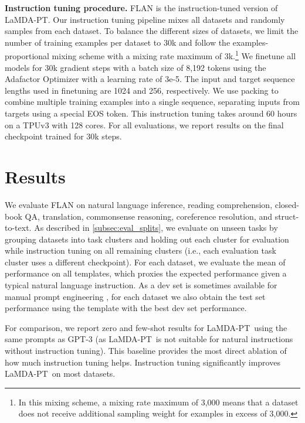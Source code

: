 \documentclass{article} \usepackage{iclr2022_conference,times}
\newcommand{\flan}{FLAN}
\newcommand{\baselm}{LaMDA-PT}
\begin{document}
\textbf{Instruction tuning procedure.}
\flan{} is the instruction-tuned version of \baselm. 
Our instruction tuning pipeline mixes all datasets and randomly samples from each dataset.
To balance the different sizes of datasets, we limit the number of training examples per dataset to 30k and follow the examples-proportional mixing scheme \citep{raffel2019exploring} with a mixing rate maximum of 3k.\footnote{In this mixing scheme, a mixing rate maximum of 3,000 means that a dataset does not receive additional sampling weight for examples in excess of 3,000.}
We finetune all models for 30k gradient steps with a batch size of 8,192 tokens using the Adafactor Optimizer \citep{shazeer2018adafactor} with a learning rate of 3e-5. 
The input and target sequence lengths used in finetuning are 1024 and 256, respectively. 
We use packing \citep{raffel2019exploring} to combine multiple training examples into a single sequence, separating inputs from targets using a special EOS token.
This instruction tuning takes around 60 hours on a TPUv3 with 128 cores.
For all evaluations, we report results on the final checkpoint trained for 30k steps.

\vspace{-1mm}
\section{Results}\label{sec:results}
\vspace{-2mm}
We evaluate \flan{} on natural language inference, reading comprehension, closed-book QA, translation, commonsense reasoning, coreference resolution, and struct-to-text. 
As described in \cref{subsec:eval_splits}, we evaluate on unseen tasks by grouping datasets into task clusters and holding out each cluster for evaluation while instruction tuning on all remaining clusters (i.e., each evaluation task cluster uses a different checkpoint).
For each dataset, we evaluate the mean of performance on all templates, which proxies the expected performance given a typical natural language instruction.
As a dev set is sometimes available for manual prompt engineering \citep{brown2020language}, for each dataset we also obtain the test set performance using the template with the best dev set performance.

For comparison, we report zero and few-shot results for \baselm\ using the same prompts as GPT-3 (as \baselm\ is not suitable for natural instructions without instruction tuning).
This baseline provides the most direct ablation of how much instruction tuning helps.
Instruction tuning significantly improves \baselm\ on most datasets.
\end{document}

